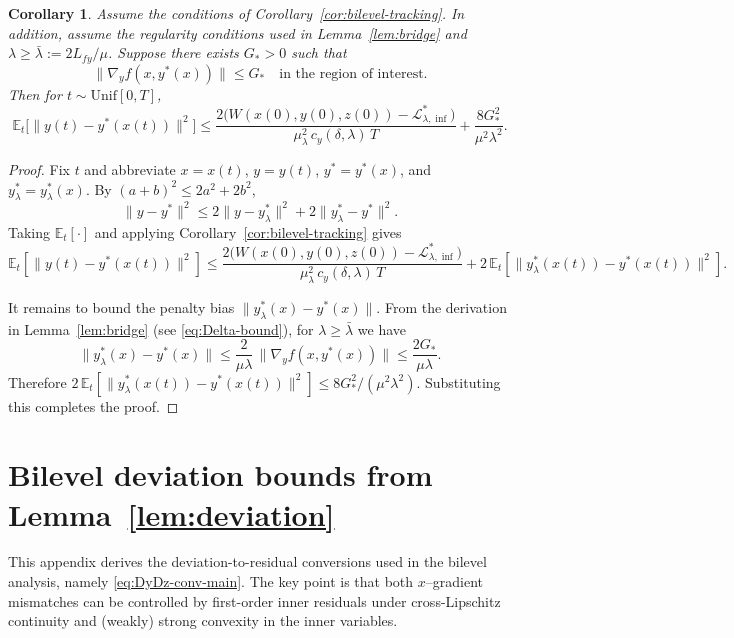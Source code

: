 \documentclass{article}
\newtheorem{corollary}[theorem]{Corollary}
\newcommand{\1}{\mathbf{1}}
\begin{document}
\begin{corollary}\label{cor:bilevel-track-ytrue}
Assume the conditions of Corollary~\ref{cor:bilevel-tracking}.
In addition, assume the regularity conditions used in Lemma~\ref{lem:bridge} and
$\lambda\ge \bar\lambda:=2L_{fy}/\mu$. Suppose there exists $G_*>0$ such that
\[
\|\nabla_y f(x,y^*(x))\|\le G_*
\quad\text{in the region of interest.}
\]
Then for $t\sim\mathrm{Unif}[0,T]$,
\begin{equation}\label{eq:y-to-ytrue}
\mathbb E_t\bigl[\|y(t)-y^*(x(t))\|^2\bigr]
\le
\frac{2\bigl(W(x(0),y(0),z(0))-\mathcal L_{\lambda,\inf}^{*}\bigr)}{\mu_\lambda^2\,c_y(\delta,\lambda)\,T}
+\frac{8G_*^2}{\mu^2\lambda^2}.
\end{equation}
\end{corollary}

\begin{proof}
Fix $t$ and abbreviate $x=x(t)$, $y=y(t)$, $y^*=y^*(x)$, and $y_\lambda^*=y_\lambda^*(x)$.
By $(a+b)^2\le 2a^2+2b^2$,
\[
\|y-y^*\|^2
\le
2\|y-y_\lambda^*\|^2 + 2\|y_\lambda^*-y^*\|^2.
\]
Taking $\mathbb E_t[\cdot]$ and applying Corollary~\ref{cor:bilevel-tracking} gives
\[
\mathbb E_t[\|y(t)-y^*(x(t))\|^2]
\le
\frac{2\bigl(W(x(0),y(0),z(0))-\mathcal L_{\lambda,\inf}^{*}\bigr)}{\mu_\lambda^2\,c_y(\delta,\lambda)\,T}
+2\,\mathbb E_t[\|y_\lambda^*(x(t))-y^*(x(t))\|^2].
\]

It remains to bound the penalty bias $\|y_\lambda^*(x)-y^*(x)\|$.
From the derivation in Lemma~\ref{lem:bridge} (see \eqref{eq:Delta-bound}), for $\lambda\ge \bar\lambda$ we have
\[
\|y_\lambda^*(x)-y^*(x)\|
\le
\frac{2}{\mu\lambda}\,\|\nabla_y f(x,y^*(x))\|
\le
\frac{2G_*}{\mu\lambda}.
\]
Therefore $2\,\mathbb E_t[\|y_\lambda^*(x(t))-y^*(x(t))\|^2]\le 8G_*^2/(\mu^2\lambda^2)$.
Substituting this completes the proof.
\end{proof} 




\section{Bilevel deviation bounds from Lemma~\ref{lem:deviation}}\label{app:deviation-bilevel}

This appendix derives the deviation-to-residual conversions used in the bilevel analysis, namely
\eqref{eq:DyDz-conv-main}. The key point is that both $x$--gradient mismatches can be controlled by
first-order inner residuals under cross-Lipschitz continuity and (weakly) strong convexity in the inner variables.
\end{document}
